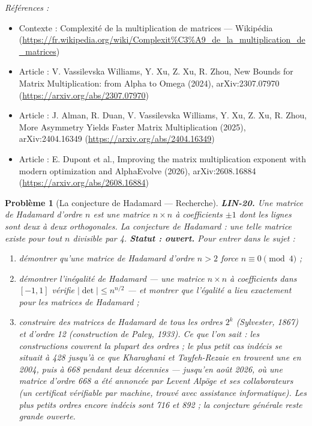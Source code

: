 \documentclass[11pt]{article}
\newtheorem{problem}{Problème}
\newenvironment{refs}{\par\small\noindent\emph{Références :}\begin{itemize}\setlength\itemsep{0pt}}{\end{itemize}\normalsize}
\begin{document}
\begin{refs}
\item Contexte : Complexité de la multiplication de matrices --- Wikipédia (\url{https://fr.wikipedia.org/wiki/Complexit%C3%A9_de_la_multiplication_de_matrices})
\item Article : V. Vassilevska Williams, Y. Xu, Z. Xu, R. Zhou, \og{} New Bounds for Matrix Multiplication: from Alpha to Omega \fg{} (2024), arXiv:2307.07970 (\url{https://arxiv.org/abs/2307.07970})
\item Article : J. Alman, R. Duan, V. Vassilevska Williams, Y. Xu, Z. Xu, R. Zhou, \og{} More Asymmetry Yields Faster Matrix Multiplication \fg{} (2025), arXiv:2404.16349 (\url{https://arxiv.org/abs/2404.16349})
\item Article : E. Dupont et al., \og{} Improving the matrix multiplication exponent with modern optimization and AlphaEvolve \fg{} (2026), arXiv:2608.16884 (\url{https://arxiv.org/abs/2608.16884})
\end{refs}

\bigskip

\begin{problem}[{La conjecture de Hadamard --- Recherche}]
\textbf{LIN-20.} Une \textit{matrice de Hadamard} d'ordre $n$ est une
matrice $n \times n$ à coefficients $\pm 1$ dont les lignes sont deux à deux orthogonales. La
conjecture de Hadamard : une telle matrice existe pour tout $n$ divisible par 4.
\textbf{Statut : ouvert.} Pour entrer dans le sujet :
\begin{enumerate}
\item[(i)] démontrer qu'une matrice de Hadamard d'ordre $n > 2$ force $n \equiv 0 \pmod 4$ ;
\item[(ii)] démontrer l'inégalité de Hadamard --- une matrice $n \times n$ à coefficients dans $[-1, 1]$
vérifie $|\det| \le n^{n/2}$ --- et montrer que l'égalité a lieu exactement pour les matrices de
Hadamard ;
\item[(iii)] construire des matrices de Hadamard de tous les ordres $2^k$ (Sylvester, 1867) et d'ordre 12
(construction de Paley, 1933). Ce que l'on sait : les constructions couvrent la plupart des ordres ;
le plus petit cas indécis se situait à 428 jusqu'à ce que Kharaghani et Tayfeh-Rezaie en trouvent une
en 2004, puis à 668 pendant deux décennies --- jusqu'en août 2026, où une matrice d'ordre 668 a été
annoncée par Levent Alpöge et ses collaborateurs (un certificat vérifiable par machine, trouvé avec
assistance informatique). Les plus petits ordres encore indécis sont 716 et 892 ; la conjecture
générale reste grande ouverte.
\end{enumerate}

\end{problem}
\end{document}

